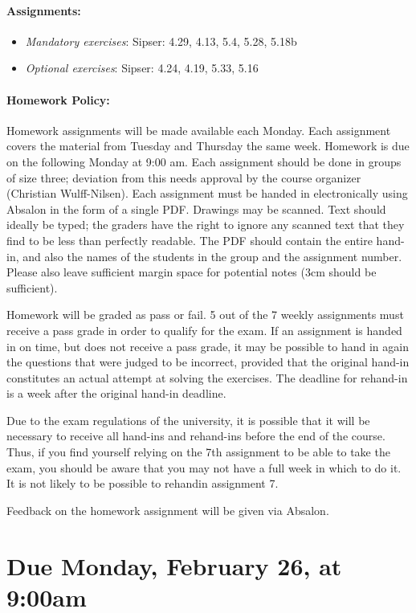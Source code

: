\documentclass[11pt]{article}
\begin{document}
\maketitle

\paragraph{Assignments:}
\begin{itemize}
\item {\em Mandatory exercises}: Sipser: 4.29, 4.13, 5.4, 5.28, 5.18b
\item {\em Optional exercises}:  Sipser: 4.24, 4.19, 5.33, 5.16
\end{itemize}

\paragraph{Homework Policy:}
Homework assignments will be made available each Monday. Each assignment covers the material from Tuesday and Thursday the same week. Homework is due on the following Monday at 9:00 am. Each assignment should be done in groups of size three; deviation from this needs approval by the course organizer (Christian Wulff-Nilsen). Each assignment must be handed in electronically using Absalon in the form of a single PDF. Drawings may be scanned. Text should ideally be typed; the graders have the right to ignore any scanned text that they find to be less than perfectly readable. The PDF should contain the entire hand-in, and also the names of the students in the group and the assignment number. Please also leave sufficient margin space for potential notes (3cm should be sufficient).

Homework will be graded as pass or fail. 5 out of the 7 weekly assignments must receive a pass grade in order to qualify for the exam. If an assignment is handed in on time, but does not receive a pass grade, it may be possible to hand in again the questions that were judged to be incorrect, provided that the original hand-in constitutes an actual attempt at solving the exercises. The deadline for rehand-in is a week after the original hand-in deadline.

Due to the exam regulations of the university, it is possible that it will be necessary to receive all hand-ins and rehand-ins before the end of the course. Thus, if you find yourself relying on the 7th assignment to be able to take the exam, you should be aware that you may not have a full week in which to do it. It is not likely to be possible to rehandin assignment 7.

Feedback on the homework assignment will be given via Absalon.



\newpage
\section*{Due Monday, February 26, at 9:00am} 


\end{document}
